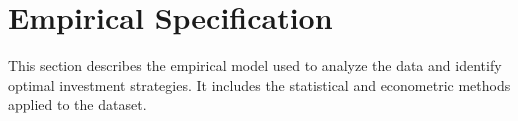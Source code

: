 \section{Empirical Specification}
This section describes the empirical model used to analyze the data and identify optimal investment strategies. It includes the statistical and econometric methods applied to the dataset.


